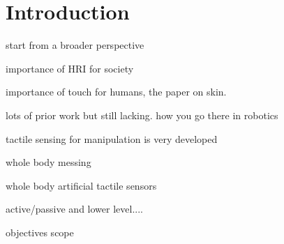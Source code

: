 \chapter{Introduction}
\label{introchap}

start from a broader perspective

importance of HRI for society

importance of touch for humans, the paper on skin.

lots of prior work but still lacking. how you go there in robotics

tactile sensing for manipulation is very developed

whole body messing

whole body artificial tactile sensors

active/passive and lower level....

objectives scope
